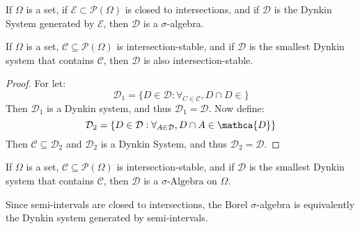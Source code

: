     \begin{theorem}
        If $\Omega$ is a set, if
        $\mathcal{E}\subset\mathcal{P}(\Omega)$ is closed
        to intersections, and if $\mathcal{D}$ is the
        Dynkin System generated by $\mathcal{E}$, then
        $\mathcal{D}$ is a $\sigma$-algebra.
    \end{theorem}
    \begin{theorem}
        If $\Omega$ is a set, $\mathcal{C}\subseteq\mathcal{P}(\Omega)$
        is intersection-stable, and if $\mathcal{D}$ is the smallest
        Dynkin system that contains $\mathcal{C}$, then $\mathcal{D}$
        is also intersection-stable.
    \end{theorem}
    \begin{proof}
        For let:
        \begin{equation}
            \mathcal{D}_{1}=
            \{D\in\mathcal{D}:\forall_{C\in\mathcal{C}},D\cap{D}\in\mathcal{}\}
        \end{equation}
        Then $\mathcal{D}_{1}$ is a Dynkin system, and thus
        $\mathcal{D}_{1}=\mathcal{D}$. Now define:
        \begin{equation}
            \mathcal{D}_{2}=\{
                D\in\mathcal{D}:\forall_{A\in\mathcal{D}},D\cap{A}\in\mathca{D}
            \}
        \end{equation}
        Then $\mathcal{C}\subseteq\mathcal{D}_{2}$ and $\mathcal{D}_{2}$ is a
        Dynkin System, and thus $\mathcal{D}_{2}=\mathcal{D}$.
    \end{proof}
    \begin{theorem}
        If $\Omega$ is a set, $\mathcal{C}\subseteq\mathcal{P}(\Omega)$
        is intersection-stable, and if $\mathcal{D}$ is the smallest
        Dynkin system that contains $\mathcal{C}$, then $\mathcal{D}$
        is a $\sigma\textrm{-Algebra}$ on $\Omega$.
    \end{theorem}
    Since semi-intervals are closed to intersections,
    the Borel $\sigma$-algebra is equivalently the
    Dynkin system generated by semi-intervals.